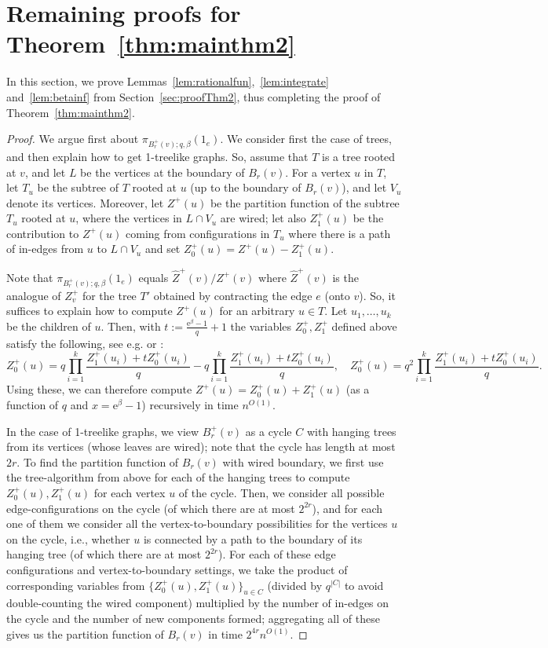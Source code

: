 \documentclass[11pt]{article}
\theoremstyle{plain}
\newcommand{\emm}{\mathrm{e}}
\newcommand{\1}{\mathbb{1}}
\begin{document}
\section{Remaining proofs for Theorem~\ref{thm:mainthm2}} \label{sec:remproof2}
In this section, we prove Lemmas~\ref{lem:rationalfun},~\ref{lem:integrate} and~\ref{lem:betainf} from Section~\ref{sec:proofThm2}, thus completing the proof of Theorem~\ref{thm:mainthm2}.
\rationalfun*
\begin{proof}
We argue first about $\pi_{B_r^{+}(v);q,\beta}(1_e)$. We consider first the case of trees, and then explain how to get 1-treelike graphs. So, assume that $T$ is a tree rooted at $v$, and let $L$ be the vertices at the boundary of $B_r(v)$.  For a vertex $u$ in $T$, let $T_u$ be the subtree of $T$ rooted at $u$ (up to the boundary of $B_r(v)$), and let $V_u$ denote its vertices. Moreover, let $Z^+(u)$ be the partition function of the subtree $T_u$ rooted at $u$, where the vertices in $L\cap V_u$ are wired; let also $Z^+_1(u)$ be the contribution to $Z^+(u)$ coming from configurations in $T_u$ where there is a path of in-edges from $u$ to $L\cap V_u$ and set $Z^+_0(u)=Z^+(u)-Z^+_1(u)$. 

Note that $\pi_{B_r^{+}(v);q,\beta}(1_e)$ equals $\hat Z^+(v)/Z^+(v)$ where $\hat Z^+(v)$ is the analogue of $Z^+_v$ for the tree $T'$ obtained by contracting the edge $e$ (onto $v$). So, it suffices to explain how to compute $Z^+(u)$ for an arbitrary $u\in T$. Let $u_1,\hdots, u_k$ be the children of $u$. Then, with $t:=\frac{\emm^\beta-1}{q}+1$ the variables $Z^+_0,Z^+_1$ defined above satisfy the following, see e.g. \cite[Fact 3.2]{rcm-on-unbounded-degree-graphs} or \cite[Lemma 33]{BGRC}:
\[
Z^+_0(u)=q \prod^k_{i=1}\frac{Z^+_1(u_i)+tZ^+_0(u_i)}{q}-q\prod^k_{i=1}\frac{Z^+_1(u_i)+tZ^+_0(u_i)}{q},\quad Z^+_0(u)=q^2 \prod^k_{i=1}\frac{Z^+_1(u_i)+tZ^+_0(u_i)}{q}.
\]
Using these, we can therefore compute $Z^+(u)=Z^+_0(u)+Z^+_1(u)$ (as a function of $q$ and $x=\emm^{\beta}-1$) recursively in time $n^{O(1)}$. 

In the case of 1-treelike graphs, we view $B^+_r(v)$ as a cycle $C$ with hanging trees from its vertices (whose leaves are wired); note that the cycle has length at most $2r$. To find the partition function of $B_r(v)$ with wired boundary, we first use the tree-algorithm from above for each of the hanging trees to compute $Z^+_0(u), Z^+_1(u)$ for each vertex $u$ of the cycle. Then, we consider all possible edge-configurations on the cycle (of which there are at most $2^{2r}$), and for each one of them we consider all the vertex-to-boundary possibilities for the vertices $u$ on the cycle, i.e., whether $u$ is connected by a path to the boundary of its hanging tree (of which there are at most $2^{2r}$). For each of these edge configurations and vertex-to-boundary settings, we take the product of corresponding variables from $\{Z^+_0(u),Z^+_1(u)\}_{u\in C}$ (divided by $q^{|C|}$ to avoid double-counting the wired component)  multiplied by the number of in-edges on the cycle and the number of new components formed; aggregating all of these gives us the partition function of $B_r(v)$ in time $2^{4r}n^{O(1)}$.


\end{proof}
\end{document}
